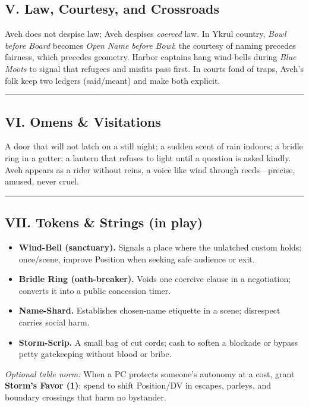\documentclass[11pt,letterpaper]{article}
\begin{document}
\subsection{V. Law, Courtesy, and Crossroads}

Aveh does not despise law; Aveh despises \emph{coerced} law. In Ykrul country, \emph{Bowl before Board} becomes \emph{Open Name before Bowl}: the courtesy of naming precedes fairness, which precedes geometry. Harbor captains hang wind-bells during \emph{Blue Moots} to signal that refugees and misfits pass first. In courts fond of traps, Aveh's folk keep two ledgers (said/meant) and make both explicit.

\medskip\hrule\medskip

\subsection{VI. Omens \& Visitations}

A door that will not latch on a still night; a sudden scent of rain indoors; a bridle ring in a gutter; a lantern that refuses to light until a question is asked kindly. Aveh appears as a rider without reins, a voice like wind through reeds---precise, amused, never cruel.

\medskip\hrule\medskip

\subsection{VII. Tokens \& Strings (in play)}

\begin{itemize}[leftmargin=*]
  \item \textbf{Wind-Bell (sanctuary).} Signals a place where the unlatched custom holds; once/scene, improve Position when seeking safe audience or exit.
  \item \textbf{Bridle Ring (oath-breaker).} Voids one coercive clause in a negotiation; converts it into a public concession timer.
  \item \textbf{Name-Shard.} Establishes chosen-name etiquette in a scene; disrespect carries social harm.
  \item \textbf{Storm-Scrip.} A small bag of cut cords; cash to soften a blockade or bypass petty gatekeeping without blood or bribe.
\end{itemize}

\emph{Optional table norm:} When a PC protects someone's autonomy at a cost, grant \textbf{Storm's Favor (1)}; spend to shift Position/DV in escapes, parleys, and boundary crossings that harm no bystander.
\end{document}
